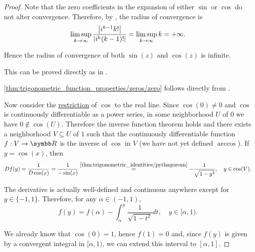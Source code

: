 \begin{proof}\mbox{}
   Note that the zero coefficients in the expansion of either \( \sin \) or \( \cos \) do not alter convergence. Therefore, by , the radius of convergence is
  \begin{equation*}
    \limsup_{k \to \infty} \frac {\left\vert i^{k-1} k! \right\vert} {\left\vert i^k (k-1)! \right\vert}
    =
    \limsup_{k \to \infty} k
    =
    +\infty.
  \end{equation*}

  Hence the radius of convergence of both \( \sin(z) \) and \( \cos(z) \) is infinite.

   This can be proved directly as in .

   \ref{thm:trigonometric_function_properties/zeros/zero} follows directly from .

  Now consider the \hyperref[def:function/expansion]{restriction} of \( \cos \) to the real line. Since \( \cos(0) \neq 0 \) and \( \cos \) is continuously differentiable as a power series, in some neighborhood \( U \) of \( 0 \) we have \( 0 \not\in \cos(U) \). Therefore the inverse function theorem holds and there exists a neighborhood \( V \subseteq U \) of \( 1 \) such that the continuously differentiable function \( f: V \to \BR \) is the inverse of \( \cos \) in \( V \) (we have not yet defined \hyperref[def:inverse_trigonometric_functions/arccos]{\( \arccos \)}). If \( y = \cos(x) \), then
  \begin{equation*}
    Df(y)
    =
    \frac 1 {D\cos(x)}
    =
    \frac 1 {-\sin(x)}
    \overset {\ref{thm:trigonometric_identities/pythagorean}} =
    -\frac 1 {\sqrt{1 - y^2}},
    \quad y \in \cos(V).
  \end{equation*}

  The derivative is actually well-defined and continuous anywhere except for \( y \in \{ -1, 1 \} \). Therefore, for any \( \alpha \in (-1, 1) \),
  \begin{equation*}
    f(y) = f(\alpha) - \int_{\alpha}^y \frac 1 {\sqrt{1 - t^2}} dt, \quad y \in [\alpha, 1).
  \end{equation*}

  We already know that \( \cos(0) = 1 \), hence \( f(1) = 0 \) and, since \( f(y) \) is given by a convergent integral in \( [\alpha, 1) \), we can extend this interval to \( [\alpha, 1] \).


\end{proof}
